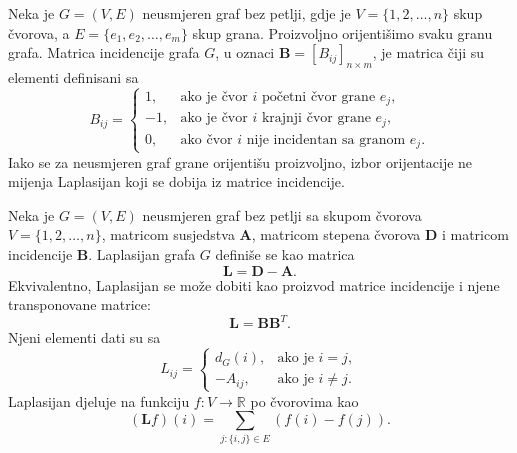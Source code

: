 \begin{definition}
   Neka je \(G=(V,E)\) neusmjeren graf bez petlji, gdje je
   \(V=\{1,2,\ldots,n\}\) skup čvorova, a
   \(E=\{e_1,e_2,\ldots,e_m\}\) skup grana. Proizvoljno orijentišimo svaku granu grafa.
   Matrica incidencije grafa \(G\), u oznaci \(\mathbf{B}=[B_{ij}]_{n\times m}\), je matrica čiji su
  elementi definisani sa
   \begin{equation}
       B_{ij} =
       \begin{cases}
           1, & \text{ako je čvor } i \text{ početni čvor grane } e_j,\\
           -1, & \text{ako je čvor } i \text{ krajnji čvor grane } e_j,\\
           0, & \text{ako čvor } i \text{ nije incidentan sa granom } e_j.
       \end{cases}
   \end{equation}
   Iako se za neusmjeren graf grane orijentišu proizvoljno, izbor orijentacije ne mijenja Laplasijan
 koji se dobija iz matrice incidencije. \cite{juric2019elementi}
   \end{definition}

   \begin{definition}
   Neka je \(G=(V,E)\) neusmjeren graf bez petlji sa skupom čvorova \linebreak\(V=\{1,2,\ldots,n\}\),
 matricom susjedstva \(\mathbf{A}\), matricom stepena čvorova \(\mathbf{D}\) i matricom incidencije
  \(\mathbf{B}\).
   Laplasijan grafa \(G\) definiše se kao matrica
   \begin{equation}
       \mathbf{L} = \mathbf{D} - \mathbf{A}.
   \end{equation}
   Ekvivalentno, Laplasijan se može dobiti kao proizvod matrice incidencije i njene transponovane
 matrice:
   \begin{equation}
       \mathbf{L}=\mathbf{B}\mathbf{B}^T.
   \end{equation}
    Njeni elementi dati su sa
   \begin{equation}
       L_{ij} =
       \begin{cases}
           d_G(i), & \text{ako je } i=j,\\
           -A_{ij}, & \text{ako je } i \neq j.
       \end{cases}
   \end{equation}
   Laplasijan djeluje na funkciju \(f:V\to\mathbb{R}\) po čvorovima kao
   \begin{equation}\label{laplasijan:djelovanje-na-funkciju}
       (\mathbf{L}f)(i)
       =
       \sum_{j:\{i,j\}\in E}\left(f(i)-f(j)\right).
   \end{equation}
    \end{definition}


